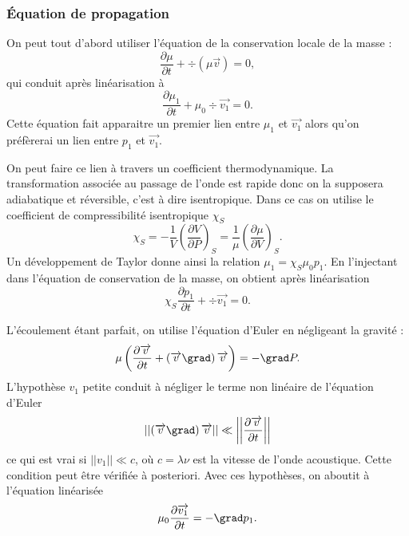 \subsubsection{Équation de propagation}

On peut tout d'abord utiliser l'équation de la conservation locale de la masse :
\begin{equation*}
\frac{\partial \mu}{\partial t} + \div(\mu\overrightarrow{v}) = 0,
\end{equation*}
qui conduit après linéarisation à
\begin{equation*}
\frac{\partial \mu_1}{\partial t} + \mu_0\div\overrightarrow{v_1} = 0.
\end{equation*}
Cette équation fait apparaitre un premier lien entre $\mu_1$ et $\overrightarrow{v_1}$ alors qu'on préfèrerai un lien entre $p_1$ et $\overrightarrow{v_1}$.

On peut faire ce lien à travers un coefficient thermodynamique.
La transformation associée au passage de l'onde est rapide donc on la supposera adiabatique et réversible, c'est à dire isentropique.
Dans ce cas on utilise le coefficient de compressibilité isentropique $\chi_S$
\begin{equation*}
\chi_S = -\frac{1}{V} \left( \frac{\partial V}{\partial P} \right)_S = \frac{1}{\mu} \left( \frac{\partial \mu}{\partial V} \right)_S.
\end{equation*}
Un développement de Taylor donne ainsi la relation $\mu_1 = \chi_S\mu_0 p_1$.
En l'injectant dans l'équation de conservation de la masse, on obtient après linéarisation
\begin{equation}
\chi_S \frac{\partial p_1}{\partial t} + \div  \overrightarrow{v_1} = 0.
\label{eq:mass_conservation}
\end{equation}

L'écoulement étant parfait, on utilise l'équation d'Euler en négligeant la gravité :
\begin{equation*}
\mu \left( \frac{\partial \overrightarrow{v}}{\partial t} + \left( \overrightarrow{v}\grad\right)\overrightarrow{v}\right) = -\grad P.
\end{equation*}
L'hypothèse $v_1$ petite conduit à négliger le terme non linéaire de l'équation d'Euler
\begin{equation*}
\left|\left|\left( \overrightarrow{v}\grad\right)\overrightarrow{v}\right|\right| \ll \left|\left|\frac{\partial\overrightarrow{v}}{\partial t}\right|\right|
\end{equation*}
ce qui est vrai si $||v_1|| \ll c$, où $c=\lambda\nu$ est la vitesse de l'onde acoustique.
Cette condition peut être vérifiée à posteriori.
Avec ces hypothèses, on aboutit à l'équation linéarisée
\begin{equation}
\mu_0 \frac{\partial \overrightarrow{v_1}}{\partial t} = -\grad p_1.
\label{eq:euler}
\end{equation}

